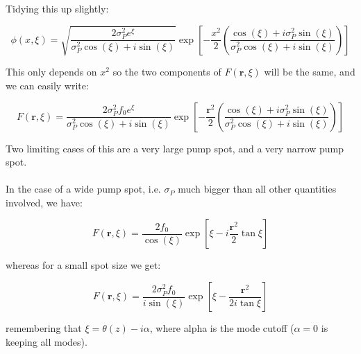 \documentclass[a4paper,nobalancelastpage]{revtex4-1}
\newcommand{\vect}[1]{\bm{#1}}
\begin{document}
Tidying this up slightly:

\begin{equation}
\phi(x,\xi) =
\sqrt{
\frac{2 \sigma_P^2 e^{\xi}}{\sigma_P^2\cos(\xi)+i \sin(\xi)} 
}
\exp{
\left[ 
-\frac{x^2}{2} \left( \frac{\cos(\xi)+i \sigma_P^2 \sin(\xi)}{\sigma_P^2 \cos(\xi)+i  \sin(\xi)}  \right) 
\right]
}
\end{equation}

This only depends on $x^2$ so the two components of $F(\textbf{r},\xi)$ will be the same, and we can easily write:

\begin{equation}
F(\textbf{r},\xi)=
\frac{2 \sigma_P^2 f_0 e^{\xi}}{\sigma_P^2\cos(\xi)+i \sin(\xi)} 
\exp{
\left[ 
-\frac{\vect{r}^2}{2} \left( \frac{\cos(\xi)+i \sigma_P^2 \sin(\xi)}{\sigma_P^2 \cos(\xi)+i  \sin(\xi)}  \right) 
\right]
}
\end{equation}

Two limiting cases of this are a very large pump spot, and a very narrow pump spot.\\
\\
In the case of a wide pump spot, i.e. $\sigma_P$ much bigger than all other quantities involved, we have:

\begin{equation}
F(\textbf{r},\xi)=
\frac{2 f_0 }{\cos(\xi)} 
\exp{
\left[ \xi
-i \frac{\vect{r}^2}{2} \tan{\xi}
\right]
}
\end{equation}

whereas for a small spot size we get:

\begin{equation}
F(\textbf{r},\xi)=
\frac{2 \sigma_P^2 f_0 }{i \sin(\xi)} 
\exp{
\left[ \xi
-\frac{\vect{r}^2}{2 i \tan \xi} 
\right]
}
\end{equation}

remembering that $\xi=\theta(z)-i \alpha$, where alpha is the mode cutoff ($\alpha=0$ is keeping all modes).
\end{document}

